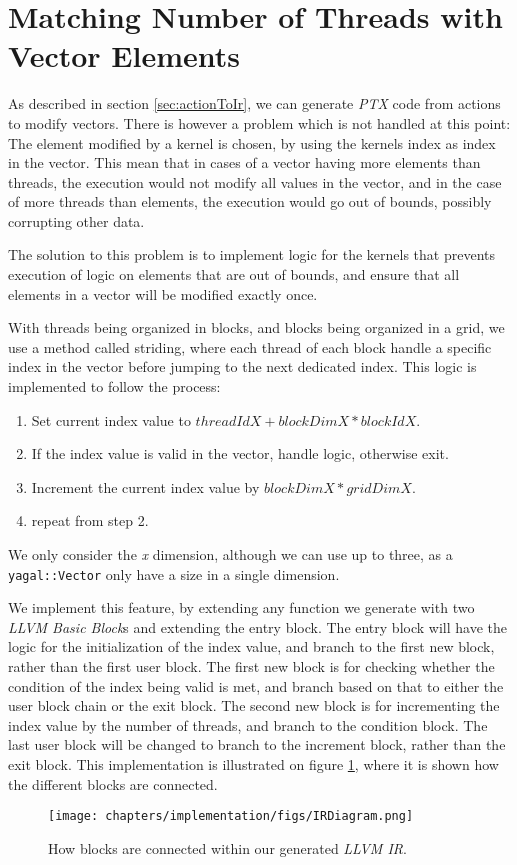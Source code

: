 \section{Matching Number of Threads with Vector Elements}
As described in section \ref{sec:actionToIr}, we can generate \textit{PTX} code from actions to modify vectors. There is however a problem which is not handled at this point: The element modified by a kernel is chosen, by using the kernels index as index in the vector. This mean that in cases of a vector having more elements than threads, the execution would not modify all values in the vector, and in the case of more threads than elements, the execution would go out of bounds, possibly corrupting other data.

The solution to this problem is to implement logic for the kernels that prevents execution of logic on elements that are out of bounds, and ensure that all elements in a vector will be modified exactly once.

With threads being organized in blocks, and blocks being organized in a grid, we use a method called striding, where each thread of each block handle a specific index in the vector before jumping to the next dedicated index. This logic is implemented to follow the process:

\begin{enumerate}
\item Set current index value to $threadIdX + blockDimX * blockIdX$.
\item If the index value is valid in the vector, handle logic, otherwise exit.
\item Increment the current index value by $blockDimX * gridDimX$.
\item repeat from step 2.
\end{enumerate}

We only consider the \textit{x} dimension, although we can use up to three, as a \texttt{yagal::Vector} only have a size in a single dimension.

We implement this feature, by extending any function we generate with two \textit{LLVM Basic Block}s and extending the entry block. The entry block will have the logic for the initialization of the index value, and branch to the first new block, rather than the first user block. The first new block is for checking whether the condition of the index being valid is met, and branch based on that to either the user block chain or the exit block. The second new block is for incrementing the index value by the number of threads, and branch to the condition block. The last user block will be changed to branch to the increment block, rather than the exit block. This implementation is illustrated on figure \ref{blockFlowLoop}, where it is shown how the different blocks are connected.

\begin{figure}[!htb]
    \centering
    \texttt{[image: chapters/implementation/figs/IRDiagram.png]}
    \caption{How blocks are connected within our generated \textit{LLVM IR}.}
    \label{blockFlowLoop}
\end{figure}